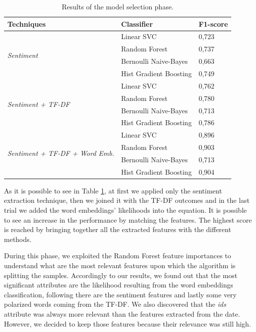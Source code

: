 \documentclass[conference]{IEEEtran}
\begin{document}
\begin{table}[h]
\begin{tabular}{@{}lll@{}}
\toprule
\textbf{Techniques}                                     & \textbf{Classifier}                       & \textbf{F1-score} \\ \midrule
\multirow{4}{*}{\textit{Sentiment}}                     & Linear SVC                       & 0,723    \\
                                               & Random Forest         & 0,737    \\
                                               & Bernoulli Naive-Bayes            & 0,663    \\
                                               & Hist Gradient Boosting & 0,749    \\ \midrule
\multirow{4}{*}{\textit{Sentiment + TF-DF}}             & Linear SVC                       & 0,762    \\
                                               & Random Forest         & 0,780    \\
                                               & Bernoulli Naive-Bayes            & 0,713    \\
                                               & Hist Gradient Boosting & 0,786    \\ \midrule
\multirow{4}{*}{\textit{Sentiment + TF-DF + Word Emb.}} & Linear SVC                       & 0,896    \\
                                               & Random Forest         & 0,903    \\
                                               & Bernoulli Naive-Bayes            & 0,713    \\
                                               & Hist Gradient Boosting & 0,904    \\ \bottomrule
\end{tabular}
\caption{Results of the model selection phase.}
\label{tab:techniques}
\end{table}
As it is possible to see in Table \ref{tab:techniques}, at first we applied only the sentiment extraction technique, then we joined it with the TF-DF outcomes and in the last trial we added the word embeddings' likelihoods into the equation. It is possible to see an increase in the performance by matching the features. The highest score is reached by bringing together all the extracted features with the different methods.

During this phase, we exploited the Random Forest feature importances to understand what are the most relevant features upon which the algorithm is splitting the samples. Accordingly to our results, we found out that the most significant attributes are the likelihood resulting from the word embeddings classification, following there are the sentiment features and lastly some very polarized words coming from the TF-DF. We also discovered that the \textit{ids} attribute was always more relevant than the features extracted from the date. However, we decided to keep those features because their relevance was still high.
\end{document}
